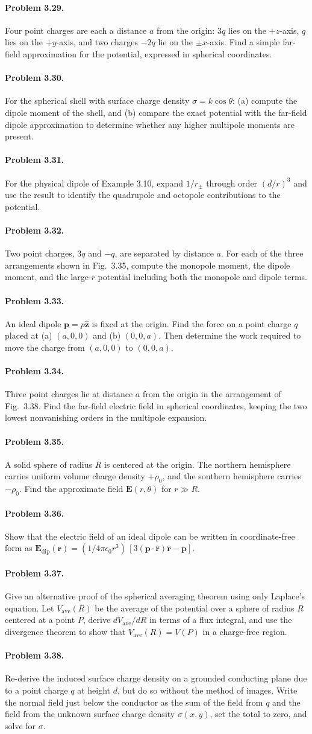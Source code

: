 \documentclass{aa}
\newcommand{\problemstatement}[2]{%
\paragraph{Problem #1.}#2\par\medskip
}
\begin{document}
\problemstatement{3.29}{Four point charges are each a distance \(a\) from the origin: \(3q\) lies on the \(+z\)-axis, \(q\) lies on the \(+y\)-axis, and two charges \(-2q\) lie on the \(\pm x\)-axis. Find a simple far-field approximation for the potential, expressed in spherical coordinates.}
\problemstatement{3.30}{For the spherical shell with surface charge density \(\sigma = k\cos\theta\): (a) compute the dipole moment of the shell, and (b) compare the exact potential with the far-field dipole approximation to determine whether any higher multipole moments are present.}
\problemstatement{3.31}{For the physical dipole of Example 3.10, expand \(1/r_{\pm}\) through order \((d/r)^3\) and use the result to identify the quadrupole and octopole contributions to the potential.}
\problemstatement{3.32}{Two point charges, \(3q\) and \(-q\), are separated by distance \(a\). For each of the three arrangements shown in Fig.~3.35, compute the monopole moment, the dipole moment, and the large-\(r\) potential including both the monopole and dipole terms.}
\problemstatement{3.33}{An ideal dipole \(\mathbf{p}=p\hat{\mathbf{z}}\) is fixed at the origin. Find the force on a point charge \(q\) placed at (a) \((a,0,0)\) and (b) \((0,0,a)\). Then determine the work required to move the charge from \((a,0,0)\) to \((0,0,a)\).}
\problemstatement{3.34}{Three point charges lie at distance \(a\) from the origin in the arrangement of Fig.~3.38. Find the far-field electric field in spherical coordinates, keeping the two lowest nonvanishing orders in the multipole expansion.}
\problemstatement{3.35}{A solid sphere of radius \(R\) is centered at the origin. The northern hemisphere carries uniform volume charge density \(+\rho_0\), and the southern hemisphere carries \(-\rho_0\). Find the approximate field \(\mathbf{E}(r,\theta)\) for \(r \gg R\).}
\problemstatement{3.36}{Show that the electric field of an ideal dipole can be written in coordinate-free form as \(\mathbf{E}_{\mathrm{dip}}(\mathbf{r}) = (1/4\pi\epsilon_0 r^3)\,[3(\mathbf{p}\cdot\hat{\mathbf{r}})\hat{\mathbf{r}}-\mathbf{p}]\).}
\problemstatement{3.37}{Give an alternative proof of the spherical averaging theorem using only Laplace's equation. Let \(V_{\mathrm{ave}}(R)\) be the average of the potential over a sphere of radius \(R\) centered at a point \(P\), derive \(dV_{\mathrm{ave}}/dR\) in terms of a flux integral, and use the divergence theorem to show that \(V_{\mathrm{ave}}(R)=V(P)\) in a charge-free region.}
\problemstatement{3.38}{Re-derive the induced surface charge density on a grounded conducting plane due to a point charge \(q\) at height \(d\), but do so without the method of images. Write the normal field just below the conductor as the sum of the field from \(q\) and the field from the unknown surface charge density \(\sigma(x,y)\), set the total to zero, and solve for \(\sigma\).}
\end{document}
